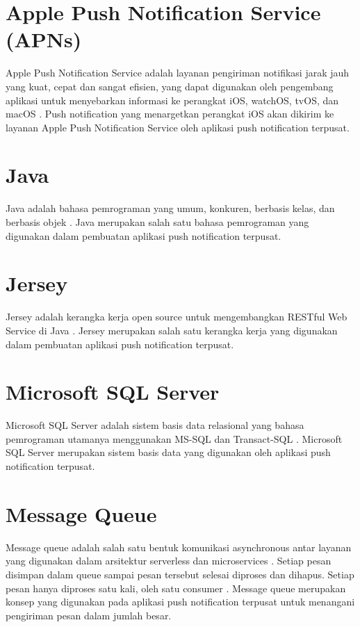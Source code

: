 \section{Apple Push Notification Service (APNs)}
\par Apple Push Notification Service adalah layanan pengiriman notifikasi jarak jauh yang kuat, cepat dan sangat efisien, yang dapat digunakan oleh pengembang aplikasi untuk menyebarkan informasi ke perangkat iOS, watchOS, tvOS, dan macOS \cite{apns-online}. Push notification yang menargetkan perangkat iOS akan dikirim ke layanan Apple Push Notification Service oleh aplikasi push notification terpusat.

\section{Java}
\par Java adalah bahasa pemrograman yang umum, konkuren, berbasis kelas, dan berbasis objek \cite{java-online}. Java merupakan salah satu bahasa pemrograman yang digunakan dalam pembuatan aplikasi push notification terpusat.

\section{Jersey}
\par Jersey adalah kerangka kerja open source untuk mengembangkan RESTful Web Service di Java \cite{jersey-online}. Jersey merupakan salah satu kerangka kerja yang digunakan dalam pembuatan aplikasi push notification terpusat.

\section{Microsoft SQL Server}
\par Microsoft SQL Server adalah sistem basis data relasional yang bahasa pemrograman utamanya menggunakan MS-SQL dan Transact-SQL \cite{sqlserver-thesis}. Microsoft SQL Server merupakan sistem basis data yang digunakan oleh aplikasi push notification terpusat.

\section{Message Queue}
\par Message queue adalah salah satu bentuk komunikasi asynchronous antar layanan yang digunakan dalam arsitektur serverless dan microservices \cite{message-queue-online}. Setiap pesan disimpan dalam queue sampai pesan tersebut selesai diproses dan dihapus. Setiap pesan hanya diproses satu kali, oleh satu consumer \cite{message-queue-online}. Message queue merupakan konsep yang digunakan pada aplikasi push notification terpusat untuk menangani pengiriman pesan dalam jumlah besar.

